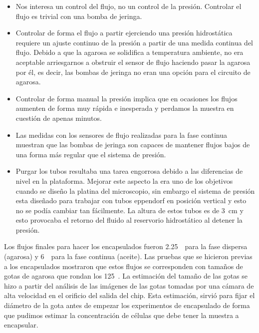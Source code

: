 \begin{itemize}

    \item Nos interesa un control del flujo, no un control de la presión. Controlar el flujo es trivial con una bomba de jeringa.
    
    \item Controlar de forma el flujo a partir ejerciendo una presión hidrostática requiere un ajuste continuo de la presión a partir de una medida continua del flujo. Debido a que la agarosa se solidifica a temperatura ambiente, no era aceptable arriesgarnos a obstruir el sensor de flujo haciendo pasar la agarosa por él, es decir, las bombas de jeringa no eran una opción para el circuito de agarosa.
    
    \item Controlar de forma manual la presión implica que en ocasiones los flujos aumenten de forma muy rápida e inesperada y perdamos la muestra en cuestión de apenas minutos.
    
    \item Las medidas con los sensores de flujo realizadas para la fase continua muestran que las bombas de jeringa son capaces de mantener flujos bajos de una forma más regular que el sistema de presión.
    
    \item Purgar los tubos resultaba una tarea engorrosa debido a las diferencias de nivel en la plataforma. Mejorar este aspecto la era uno de los objetivos cuando se diseño la platina del microscopio, sin embargo el sistema de presión esta diseñado para trabajar con tubos eppendorf en posición vertical y esto no se podía cambiar tan fácilmente. La altura de estos tubos es de 3~cm y esto provocaba el retorno del fluido al reservorio hidrostático al detener la presión.
    
\end{itemize}


Los flujos finales para hacer los encapsulados fueron 2.25~\microlitrosporminuto\ para la fase dispersa (agarosa) y 6~\microlitro\ para la fase continua (aceite). Las pruebas que se hicieron previas a los encapsulados mostraron que estos flujos se corresponden con tamaños de gotas de agarosa que rondan los 125~\micrometro. La estimación del tamaño de las gotas se hizo a partir del análisis de las imágenes de las gotas tomadas por una cámara de alta velocidad en el orificio del salida del chip. Esta estimación, sirvió para fijar el diámetro de la gota antes de empezar los experimentos de encapsulado de forma que pudimos estimar la concentración de células que debe tener la muestra a encapsular.


